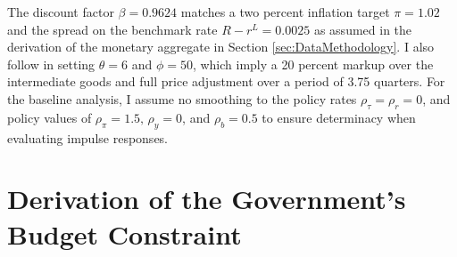 \documentclass[11pt,a4paper,margin=1.5in]{article}
\begin{document}
The discount factor $\beta = 0.9624$ matches a two percent inflation target $\pi = 1.02$ and the spread on the benchmark rate $R - r^L = 0.0025$ as assumed in the derivation of the monetary aggregate in Section \ref{sec:DataMethodology}.
I also follow \citet{Belongia-Ireland:2014} in setting $\theta = 6$ and $\phi=50$, which imply a 20 percent markup over the intermediate goods and full price adjustment over a period of 3.75 quarters.
For the baseline analysis, I assume no smoothing to the policy rates $\rho_\tau = \rho_r = 0$, and policy values of $\rho_\pi = 1.5,\, \rho_y = 0$, and $\rho_b = 0.5$ to ensure determinacy when evaluating impulse responses.


\newpage
\section{Derivation of the Government's Budget Constraint}
\label{app:govt_budget}
\end{document}
